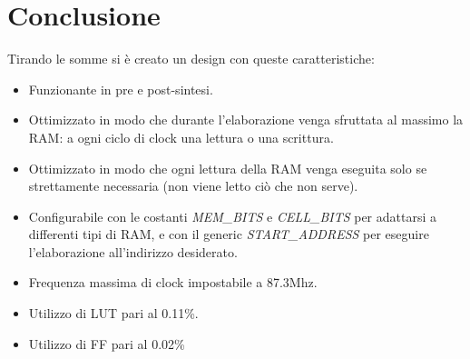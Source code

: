 \documentclass{article}
\begin{document}
\section{Conclusione}
Tirando le somme si è creato un design con queste caratteristiche:
\begin{itemize}
    \item Funzionante in pre e post-sintesi.
    \item Ottimizzato in modo che durante l'elaborazione venga sfruttata al massimo la RAM: a ogni ciclo di clock una lettura o una scrittura.
    \item Ottimizzato in modo che ogni lettura della RAM venga eseguita solo se strettamente necessaria (non viene letto ciò che non serve).
    \item Configurabile con le costanti \textit{MEM\_BITS} e \textit{CELL\_BITS} per adattarsi a differenti tipi di RAM, e con il generic \textit{START\_ADDRESS} per eseguire l'elaborazione all'indirizzo desiderato.
    \item Frequenza massima di clock impostabile a 87.3Mhz.
    \item Utilizzo di LUT pari al 0.11\%.
    \item Utilizzo di FF pari al 0.02\%
\end{itemize}
\end{document}
